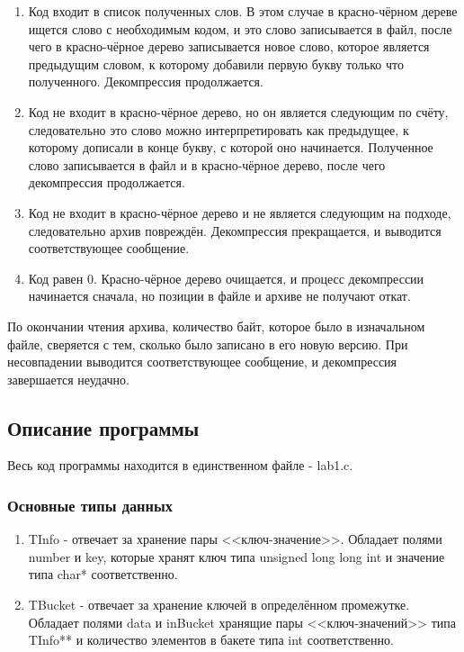 \documentclass[12pt]{article}
\begin{document}
\begin{enumerate}
\item Код входит в список полученных слов. В этом случае в красно-чёрном дереве ищется слово с необходимым кодом, и это слово записывается в файл, после чего в красно-чёрное дерево записывается новое слово, которое является предыдущим словом, к которому добавили первую букву только что полученного. Декомпрессия продолжается.
\item Код не входит в красно-чёрное дерево, но он является следующим по счёту, следовательно это слово можно интерпретировать как предыдущее, к которому дописали в конце букву, с которой оно начинается. Полученное слово записывается в файл и в красно-чёрное дерево, после чего декомпрессия продолжается.
\item Код не входит в красно-чёрное дерево и не является следующим на подходе, следовательно архив повреждён. Декомпрессия прекращается, и выводится соответствующее сообщение.
\item Код равен $0$. Красно-чёрное дерево очищается, и процесс декомпрессии начинается сначала, но позиции в файле и архиве не получают откат.
\end{enumerate}

По окончании чтения архива, количество байт, которое было в изначальном файле, сверяется с тем, сколько было записано в его новую версию. При несовпадении выводится соответствующее сообщение, и декомпрессия завершается неудачно.


\subsection*{Описание программы}

 Весь код  программы находится в единственном файле - lab1.c.

\subsubsection*{Основные типы данных}

\begin{enumerate}
\item TInfo - отвечает за хранение пары <<ключ-значение>>. Обладает полями number и key, которые хранят ключ типа unsigned long long int и значение типа char* соответственно.
\item TBucket - отвечает за хранение ключей в определённом промежутке. Обладает полями data и inBucket хранящие пары <<ключ-значений>> типа TInfo** и количество элементов в бакете типа int соответственно.
\end{enumerate}
\end{document}
